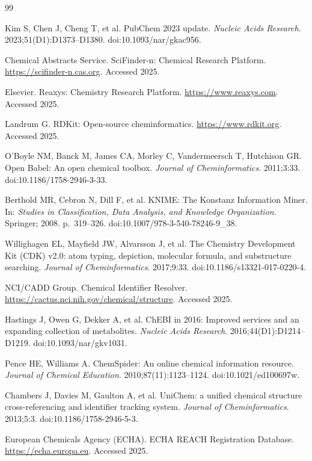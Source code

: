 \documentclass[10pt]{article}
\begin{document}
\begin{thebibliography}{99}

Kim S, Chen J, Cheng T, et al.
PubChem 2023 update.
\emph{Nucleic Acids Research}. 2023;51(D1):D1373--D1380.
doi:10.1093/nar/gkac956.

Chemical Abstracts Service.
SciFinder-n: Chemical Research Platform.
\url{https://scifinder-n.cas.org}. Accessed 2025.

Elsevier.
Reaxys: Chemistry Research Platform.
\url{https://www.reaxys.com}. Accessed 2025.

Landrum G.
RDKit: Open-source cheminformatics.
\url{https://www.rdkit.org}. Accessed 2025.

O'Boyle NM, Banck M, James CA, Morley C, Vandermeersch T, Hutchison GR.
Open Babel: An open chemical toolbox.
\emph{Journal of Cheminformatics}. 2011;3:33.
doi:10.1186/1758-2946-3-33.

Berthold MR, Cebron N, Dill F, et al.
KNIME: The Konstanz Information Miner.
In: \emph{Studies in Classification, Data Analysis, and Knowledge Organization}. Springer; 2008. p.~319--326.
doi:10.1007/978-3-540-78246-9\_38.

Willighagen EL, Mayfield JW, Alvarsson J, et al.
The Chemistry Development Kit (CDK) v2.0: atom typing, depiction, molecular formula, and substructure searching.
\emph{Journal of Cheminformatics}. 2017;9:33.
doi:10.1186/s13321-017-0220-4.

NCI/CADD Group.
Chemical Identifier Resolver.
\url{https://cactus.nci.nih.gov/chemical/structure}. Accessed 2025.

Hastings J, Owen G, Dekker A, et al.
ChEBI in 2016: Improved services and an expanding collection of metabolites.
\emph{Nucleic Acids Research}. 2016;44(D1):D1214--D1219.
doi:10.1093/nar/gkv1031.

Pence HE, Williams A.
ChemSpider: An online chemical information resource.
\emph{Journal of Chemical Education}. 2010;87(11):1123--1124.
doi:10.1021/ed100697w.

Chambers J, Davies M, Gaulton A, et al.
UniChem: a unified chemical structure cross-referencing and identifier tracking system.
\emph{Journal of Cheminformatics}. 2013;5:3.
doi:10.1186/1758-2946-5-3.

European Chemicals Agency (ECHA).
ECHA REACH Registration Database.
\url{https://echa.europa.eu}. Accessed 2025.


\end{thebibliography}
\end{document}
